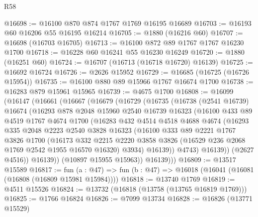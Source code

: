 \begin{lexlean}{R58}
\begin{coremodule}
@16698 := @16100 @870 @874 @1767 @1769 @16195 @16689
@16703 := @16193 @60 @16206 @55 @16195 @16214
@16705 := @1880 (@16216 @60)
@16707 := @16698 (@16703 @16705)
@16713 := @16100 @872 @89 @1767 @1767 @16230 @1700
@16718 := @16228 @60 @16241 @55 @16230 @16249
@16720 := @1880 (@16251 @60)
@16724 := @16707 (@16713 (@16718 @16720) @16139)
@16725 := @16692 @16724
@16726 := @2626 @15952
@16729 := @16685 (@16725 (@16726 @15954))
@16735 := @16100 @880 @89 @15966 @1767 @16674 @1700
@16738 := @16283 @879 @15961 @15965
@16739 := @4675 @1700
@16808 := @16099
    (@16147
      (@16661
        (@16667
          (@16679
            (@16729
              (@16735
                (@16738
                  (@2541 @16739)
                  @16674
                  (@16293
                    @878
                    @2048
                    @15960
                    @2540
                    @16739
                    @16323
                    (@16100
                      @433
                      @89
                      @4519
                      @1767
                      @4674
                      @1700
                      (@16283
                        @432
                        @4514
                        @4518
                        @4688
                        @4674
                        (@16293
                          @335
                          @2048
                          @2223
                          @2540
                          @3828
                          @16323
                          (@16100
                            @333
                            @89
                            @2221
                            @1767
                            @3826
                            @1700
                            (@16173
                              @332
                              @2215
                              @2220
                              @3858
                              @3826
                              (@16529 @236 @2068 @1769 @2542 @1955 @16570 @16320)
                              @3934)
                            @16139))
                        @4743)
                      @16139))
                  (@2627 @4516))
                @16139))
            (@10897 @15955 @15963))
          @16139)))
@16809 := @13517 @15589
@16817 := fun (a : @47) => fun (b : @47) => @16018 (@16041 (@16081 (@16808 (@16809 @15981 @15984))))
@16818 := @13740 @1769
@16819 := @4511 @15526
@16824 := @13732 (@16818 (@13758 (@13765 @16819 @1769)))
@16825 := @1766 @16824
@16826 := @7099 @13734
@16828 := @16826 (@13771 @15529)

\end{coremodule}
\end{lexlean}
